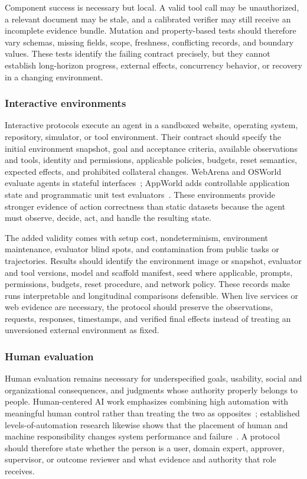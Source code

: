 Component success is necessary but local. A valid tool call may be unauthorized, a relevant document may be stale, and a calibrated verifier may still receive an incomplete evidence bundle. Mutation and property-based tests should therefore vary schemas, missing fields, scope, freshness, conflicting records, and boundary values. These tests identify the failing contract precisely, but they cannot establish long-horizon progress, external effects, concurrency behavior, or recovery in a changing environment.

\subsubsection{Interactive environments}

Interactive protocols execute an agent in a sandboxed website, operating system, repository, simulator, or tool environment. Their contract should specify the initial environment snapshot, goal and acceptance criteria, available observations and tools, identity and permissions, applicable policies, budgets, reset semantics, expected effects, and prohibited collateral changes. WebArena and OSWorld evaluate agents in stateful interfaces~\cite{zhou2024webarena,xie2024osworld}; AppWorld adds controllable application state and programmatic unit test evaluators~\cite{trivedi2024appworld}. These environments provide stronger evidence of action correctness than static datasets because the agent must observe, decide, act, and handle the resulting state.

The added validity comes with setup cost, nondeterminism, environment maintenance, evaluator blind spots, and contamination from public tasks or trajectories. Results should identify the environment image or snapshot, evaluator and tool versions, model and scaffold manifest, seed where applicable, prompts, permissions, budgets, reset procedure, and network policy. These records make runs interpretable and longitudinal comparisons defensible. When live services or web evidence are necessary, the protocol should preserve the observations, requests, responses, timestamps, and verified final effects instead of treating an unversioned external environment as fixed.

\subsubsection{Human evaluation}

Human evaluation remains necessary for underspecified goals, usability, social and organizational consequences, and judgments whose authority properly belongs to people. Human-centered AI work emphasizes combining high automation with meaningful human control rather than treating the two as opposites~\cite{shneiderman2020hcai}; established levels-of-automation research likewise shows that the placement of human and machine responsibility changes system performance and failure~\cite{parasuraman2000levels}. A protocol should therefore state whether the person is a user, domain expert, approver, supervisor, or outcome reviewer and what evidence and authority that role receives.

